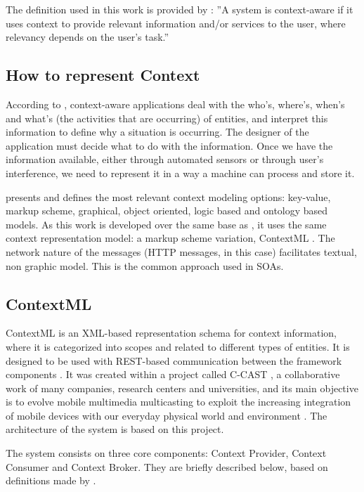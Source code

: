 The definition used in this work is provided by \cite{dey2000providing}: ''A system is context-aware if it uses context to provide relevant information and/or services to the user, where relevancy depends on the user's task.''

\subsection{How to represent Context}
According to \cite{dey2000providing}, context-aware applications deal with the who's, where's, when's and what's (the activities that are occurring) of entities, and interpret this information to define why a situation is occurring. The designer of the application must decide what to do with the information. Once we have the information available, either through automated sensors or through user's interference, we need to represent it in a way a machine can process and store it.

\cite{baldauf2007survey} presents and defines the most relevant context modeling options: key-value, markup scheme, graphical, object oriented, logic based and ontology based models. As this work is developed over the same base as \cite{crippa2010}, it uses the same context representation model: a markup scheme variation, ContextML \cite{knappmeyer2010contextml}. The network nature of the messages (HTTP messages, in this case) facilitates textual, non graphic model. This is the common approach used in SOAs. 

\subsection{ContextML}

ContextML is an XML-based representation schema for context information, where it is categorized into scopes and related to different types of entities. It is designed to be used with REST-based communication between the framework components \cite{knappmeyer2010contextml}. It was created within a project called C-CAST \cite{ccast}, a collaborative work of many companies, research centers and universities, and its main objective is to evolve mobile multimedia multicasting to exploit the increasing integration of mobile devices with our everyday physical world and environment \cite{crippa2010}. The architecture of the system is based on this project.

The system consists on three core components: Context Provider, Context Consumer and Context Broker. They are briefly described below, based on definitions made by \cite{knappmeyer2010contextml}. 



